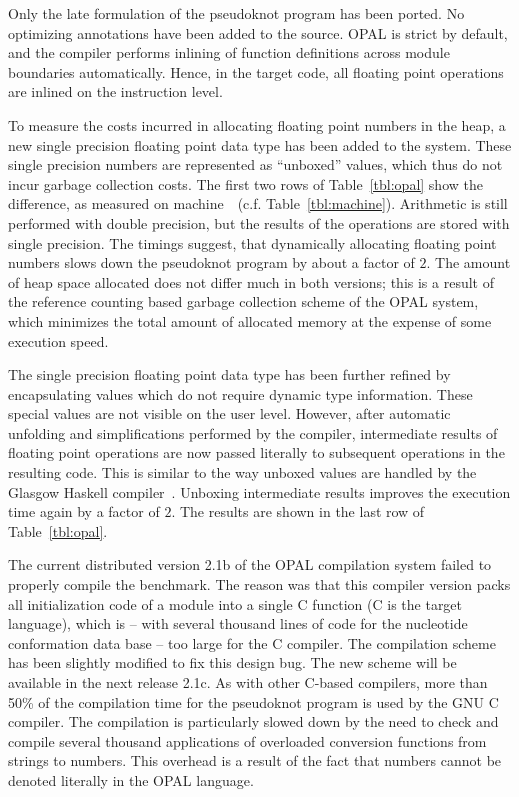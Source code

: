 Only the late formulation of the pseudoknot program has been ported. No
optimizing annotations have been added to the source. OPAL is strict by
default, and the compiler performs inlining of function definitions
across module boundaries automatically. Hence, in the target code, all
floating point operations are inlined on the instruction level.

To measure the costs incurred in allocating floating point numbers in
the heap, a new single precision floating point data type has been
added to the system. These single precision numbers are represented as
``unboxed'' values, which thus do not incur garbage collection costs.
The first two rows of Table~\ref{tbl:opal} show the difference, as
measured on machine~\sysopal~(c.f. Table~\ref{tbl:machine}).
Arithmetic is still performed
with double precision, but the results of the operations are stored
with single precision. The timings suggest, that dynamically allocating
floating point numbers slows down the pseudoknot program by about a
factor of $2$. The amount of heap space allocated does not differ much
in both versions; this is a result of the reference counting based
garbage collection scheme of the OPAL system, which minimizes the total
amount of allocated memory at the expense of some execution speed.

The single precision floating point data type has been further refined
by encapsulating values which do not require dynamic type information.
These special values are not visible on the user level. However, after
automatic unfolding and simplifications performed by the compiler,
intermediate results of floating point operations are now passed
literally to subsequent operations in the resulting code. This is
similar to the way unboxed values are handled by the Glasgow Haskell
compiler~\cite{Pey91b}. Unboxing intermediate results improves the
execution time again by a factor of $2$. The results are shown in the
last row of Table~\ref{tbl:opal}.

The current distributed version 2.1b of the OPAL compilation system
failed to properly compile the benchmark. The reason was that this
compiler version packs all initialization code of a module into a
single C function (C is the target language), which is -- with several
thousand lines of code for the nucleotide conformation data base -- too
large for the C compiler. The compilation scheme has been slightly
modified to fix this design bug. The new scheme will be available in
the next release 2.1c.  As with other C-based compilers, more than
50\% of the compilation time for the pseudoknot program is used by the
GNU C compiler. The compilation is particularly slowed down by the
need to check and compile several thousand applications of overloaded
conversion functions from strings to numbers. This overhead is a
result of the fact that numbers cannot be denoted literally in the
OPAL language.

